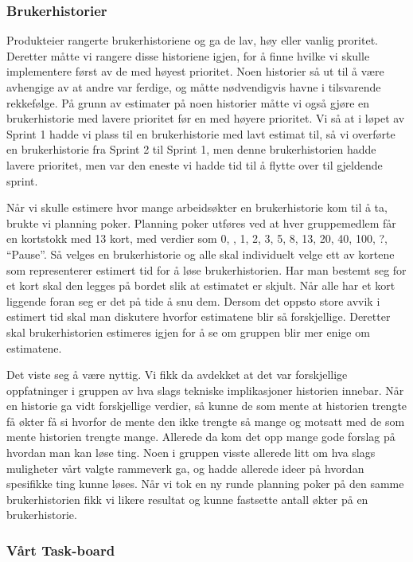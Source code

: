 \documentclass[12pt,a4paper,norsk]{article}
\begin{document}
	\subsubsection{Brukerhistorier}
	Produkteier rangerte brukerhistoriene og ga de lav, høy eller vanlig proritet. Deretter måtte vi rangere disse historiene igjen, for å finne hvilke vi skulle implementere først av de med høyest prioritet. Noen historier så ut til å være avhengige av at andre var ferdige, og måtte nødvendigvis havne i tilsvarende rekkefølge. På grunn av estimater på noen historier måtte vi også gjøre en brukerhistorie med lavere prioritet før en med høyere prioritet. Vi så at i løpet av Sprint 1 hadde vi plass til en brukerhistorie med lavt estimat til, så vi overførte en brukerhistorie fra Sprint 2 til Sprint 1, men denne brukerhistorien hadde lavere prioritet, men var den eneste vi hadde tid til å flytte over til gjeldende sprint. 

    Når vi skulle estimere hvor mange arbeidsøkter en brukerhistorie kom til å ta, brukte vi planning poker. Planning poker utføres ved at hver gruppemedlem får en kortstokk med 13 kort, med verdier som 0, , 1, 2, 3, 5, 8, 13, 20, 40, 100, ?, “Pause”. Så velges en brukerhistorie og alle skal individuelt velge ett av kortene som representerer estimert tid for å løse brukerhistorien. Har man bestemt seg for et kort skal den legges på bordet slik at estimatet er skjult. Når alle har et kort liggende foran seg er det på tide å snu dem. Dersom det oppsto store avvik i estimert tid skal man diskutere hvorfor estimatene blir så forskjellige. Deretter skal brukerhistorien estimeres igjen for å se om gruppen blir mer enige om estimatene.

    Det viste seg å være nyttig. Vi fikk da avdekket at det var forskjellige oppfatninger i gruppen av hva slags tekniske implikasjoner historien innebar. Når en historie ga vidt forskjellige verdier, så kunne de som mente at historien trengte få økter få si hvorfor de mente den ikke trengte så mange og motsatt med de som mente historien trengte mange. Allerede da kom det opp mange gode forslag på hvordan man kan løse ting. Noen i gruppen visste allerede litt om hva slags muligheter vårt valgte rammeverk ga, og hadde allerede ideer på hvordan spesifikke ting kunne løses. Når vi tok en ny runde planning poker på den samme brukerhistorien fikk vi likere resultat og kunne fastsette antall økter på en brukerhistorie. 

	
	\subsubsection{Vårt Task-board}
\end{document}
